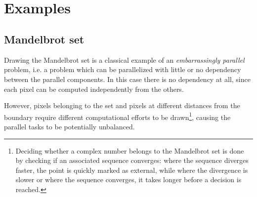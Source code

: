 
~\\~
\section{Examples} \label{sec:examples}
\enlargethispage{2\baselineskip} %



\subsection{Mandelbrot set}
Drawing the Mandelbrot set is a classical example of an \emph{embarrassingly parallel} problem, i.e. a problem which can be parallelized with little or no dependency between the parallel components. In this case there is no dependency at all, since each pixel can be computed independently from the others.

However, pixels belonging to the set and pixels at different distances from the boundary require different computational efforts to be drawn\footnote{Deciding whether a complex number belongs to the Mandelbrot set is done by checking if an associated sequence converges: where the sequence diverges faster, the point is quickly marked as external, while where the divergence is slower or where the sequence converges, it takes longer before a decision is reached.}, causing the parallel tasks to be potentially unbalanced.

